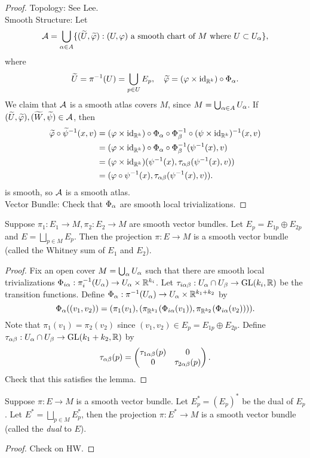 \begin{proof}
    Topology: See Lee. \\
    Smooth Structure: Let 
    $$\mathcal{A} = \bigcup_{\alpha \in A} \{(\widetilde{U}, \widetilde{\varphi}): (U,\varphi) \text{ a smooth chart of }M\text{ where }U \subset U_\alpha \}, $$
    where 
    $$\widetilde{U} = \pi^{-1}(U) = \bigcup_{p \in U}E_p, \quad \widetilde{\varphi} = (\varphi \times \mathrm{id}_{\mathbb{R}^k}) \circ \Phi_\alpha. $$ We claim that $\mathcal{A}$ is a smooth atlas covers $M$, since $M = \bigcup_{\alpha \in A}U_\alpha$. If $(\widetilde{U}, \widetilde{\varphi}), (\widetilde{W}, \widetilde{\psi}) \in \mathcal{A}$, then 
    \begin{align*}
    \widetilde{\varphi} \circ \widetilde{\psi}^{-1}(x,v)
    &= (\varphi \times \mathrm{id}_{\mathbb{R}^k}) \circ \Phi_\alpha \circ \Phi_\beta^{-1} \circ (\psi \times \mathrm{id}_{\mathbb{R}^k})^{-1}(x,v) \\
    &= (\varphi \times \mathrm{id}_{\mathbb{R}^k}) \circ \Phi_\alpha \circ \Phi_\beta^{-1}(\psi^{-1}(x), v) \\
    &= (\varphi \times \mathrm{id}_{\mathbb{R}^k})(\psi^{-1}(x), \tau_{\alpha\beta}(\psi^{-1}(x), v)) \\
    &= (\varphi \circ \psi^{-1}(x), \tau_{\alpha\beta}(\psi^{-1}(x), v)).
    \end{align*}
    is smooth, so $\mathcal{A}$ is a smooth atlas. \\
    Vector Bundle: Check that $\Phi_\alpha$ are smooth local trivializations. 
\end{proof}
\begin{example}
    Suppose $\pi_1: E_1 \to M, \pi_2: E_2 \to M$ are smooth vector bundles. Let $E_p = E_{1p} \oplus E_{2p}$ and $E = \bigsqcup_{p \in M}E_p$. Then the projection $\pi:E \to M$ is a smooth vector bundle (called the Whitney sum of $E_1$ and $E_2$). 
\end{example}
\begin{proof}
    Fix an open cover $M = \bigcup_{\alpha}U_\alpha$ such that there are smooth local trivializations $\Phi_{i\alpha}:\pi_i^{-1}(U_\alpha) \to U_\alpha \times \mathbb{R}^{k_i}$. Let $\tau_{i\alpha\beta}:U_\alpha \cap U_\beta \to \mathrm{GL}(k_i, \mathbb{R})$ be the transition functions.
    Define $\Phi_\alpha:\pi^{-1}(U_\alpha) \to U_\alpha \times \mathbb{R}^{k_1+k_2}$ by 
    $$\Phi_\alpha((v_1,v_2)) = (\pi_1(v_1), (\pi_{\mathbb{R}^{k_1}}(\Phi_{i\alpha}(v_1)), \pi_{\mathbb{R}^{k_2}}(\Phi_{i\alpha}(v_2)) ) ).$$
    Note that $\pi_1(v_1) = \pi_2(v_2)$ since $(v_1,v_2) \in E_p = E_{1p} \oplus E_{2p}$. 
    Define $\tau_{\alpha\beta}: U_\alpha \cap U_\beta \to \mathrm{GL}(k_1+k_2, \mathbb{R})$ by 
    $$\tau_{\alpha\beta}(p) = \begin{pmatrix}
    \tau_{1\alpha\beta}(p) & 0 \\
    0 & \tau_{2\alpha\beta}(p) \end{pmatrix}. $$
    Check that this satisfies the lemma. 
\end{proof}
\begin{example}[(Dual)]
    Suppose $\pi:E \to M$ is a smooth vector bundle. Let $E_p^* = (E_p)^*$ be the dual of $E_p$. Let $E^* = \bigsqcup_{p \in M}E_p^*$, then the projection $\pi:E^* \to M$ is a smooth vector bundle (called the \textit{dual} to $E$). 
\end{example}
\begin{proof}
    Check on HW. 
\end{proof}

